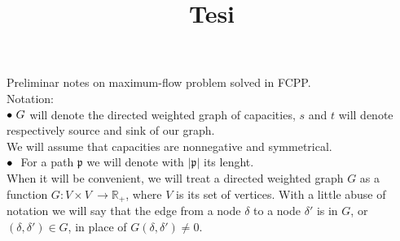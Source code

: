 \documentclass{article}
\title{Tesi}
\author{}
\date{}
\theoremstyle{plain}
\theoremstyle{definition}
\theoremstyle{remark}
\begin{document}
Preliminar notes on maximum-flow problem solved in FCPP.\\
Notation:\\
 $\small\bullet\ G$ will denote the directed weighted graph of capacities, 
 $s$ and $t$ will denote respectively source and sink of our graph.\\
We will assume that capacities are nonnegative and symmetrical.\\
 $\small\bullet\ $  For a path $\mathfrak{p}$ we will denote with $|\mathfrak{p}|$ its lenght.\\

When it will be convenient, we will treat a directed weighted graph $G$ as a function $G: V\times V\ \rightarrow \mathbb{R_{+}}$, where $V$ is its set of vertices. With a little abuse of notation we will say that the edge from a node $\delta$ to a node $\delta'$ is in $G$, or $(\delta, \delta') \in G$,  in place of $G(\delta, \delta') \not= 0$.\\
\end{document}

